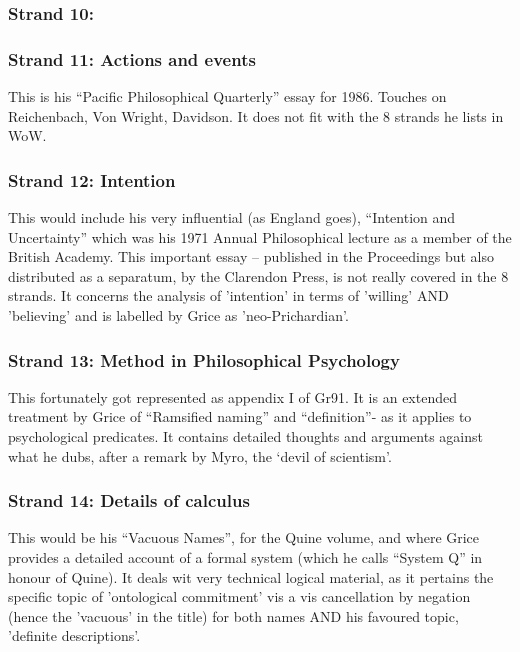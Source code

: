 \documentclass[10pt,titlepage]{book}
\begin{document}
\subsubsection{Strand 10: }

\subsubsection{Strand 11: Actions and events}

This is his ``Pacific Philosophical Quarterly'' essay for 1986.
Touches on Reichenbach, Von Wright, Davidson.
It does not fit with the 8 strands he lists in WoW.
 
\subsubsection{Strand 12: Intention}

This would include his very influential (as England goes), ``Intention and Uncertainty'' which was his 1971 Annual Philosophical  
lecture as a member of the British Academy.
This important essay -- published in the Proceedings but also distributed as a separatum, by the Clarendon Press, is  not really covered in the 8 strands.
It concerns the analysis of 'intention' in terms of 'willing' AND 'believing' and is labelled by Grice as 'neo-Prichardian'.
 
\subsubsection{Strand 13: Method in Philosophical Psychology}

This fortunately got represented as appendix I of Gr91\cite{grice91}.
It is an extended treatment by Grice of ``Ramsified naming'' and ``definition''- as it applies to psychological predicates.
It contains detailed thoughts and arguments against what he dubs, after a remark by Myro, the `devil of scientism'. 
 
\subsubsection{Strand 14: Details of calculus}

This would be his ``Vacuous Names'', for the Quine volume, and where Grice provides a detailed account of a formal system (which he calls ``System Q'' in honour of Quine).
It deals wit very technical logical material, as it pertains the specific topic of 'ontological commitment' vis a vis cancellation by negation (hence the 'vacuous' in the title) for both names AND his favoured topic, 'definite descriptions'.
 
\end{document}
